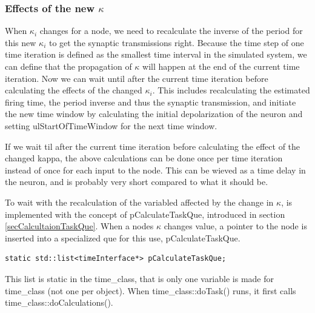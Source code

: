 
			\subsubsection{Effects of the new $\kappa$}
			When $\kappa_i$ changes for a node, we need to recalculate the inverse of the period for this new $\kappa_i$ to get the synaptic transmissions right.
			Because the time step of one time iteration is defined as the smallest time interval in the simulated system, we can define that the propagation of $\kappa$ will happen at the end of the current time iteration. %
			Now %
			 we can wait until after the current time iteration before calculating the effects of the changed $\kappa_i$.
			This includes recalculating the estimated firing time, the period inverse and thus the synaptic transmission, and initiate the new time window by calculating the initial depolarization of the neuron and setting 
				ulStartOfTimeWindow for the next time window.

			If we wait til after the current time iteration before calculating the effect of the changed kappa, the above calculations can be done once per time iteration instead of once for each input to the node.
			This can be wieved as a time delay in the neuron, and is probably  very short compared to what it should be. %


			To wait with the recalculation of the variabled affected by the change in $\kappa$, is implemented with the concept of pCalculateTaskQue, introduced in section \ref{secCalcultaionTaskQue}.
			When a nodes $\kappa$ changes value, a pointer to the node is inserted into a specialized que for this use, pCalculateTaskQue.
\begin{lstlisting}
static std::list<timeInterface*> pCalculateTaskQue;
\end{lstlisting}
			This list is static in the time\_class, that is only one variable is made for time\_class (not one per object).
			When time\_class::doTask() runs, it first calls time\_class::doCalculations().

